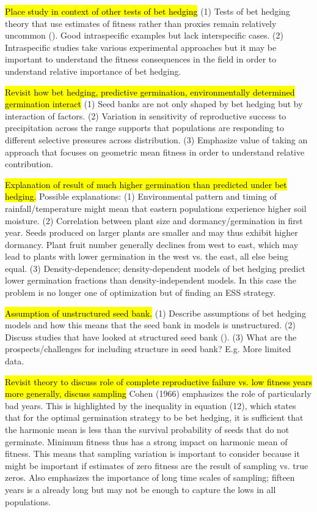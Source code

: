 \documentclass[12pt, oneside, titlepage]{article}   	%
\begin{document}
{\hl{Place study in context of other tests of bet hedging} (1) Tests of bet hedging theory that use estimates of fitness rather than proxies remain relatively uncommon (\cite{simons2011}). Good intraspecific examples but lack interspecific cases. (2) Intraspecific studies take various experimental approaches but it may be important to understand the fitness consequences in the field in order to understand relative importance of bet hedging. 

\hl{Revisit how bet hedging, predictive germination, environmentally determined germination interact} (1) Seed banks are not only shaped by bet hedging but by interaction of factors. (2) Variation in sensitivity of reproductive success to precipitation across the range supports that populations are responding to different selective pressures across distribution. (3) Emphasize value of taking an approach that focuses on geometric mean fitness in order to understand relative contribution.

\hl{Explanation of result of much higher germination than predicted under bet hedging.} Possible explanations: (1) Environmental pattern and timing of rainfall/temperature might mean that eastern populations experience higher soil moisture. (2) Correlation between plant size and dormancy/germination in first year. Seeds produced on larger plants are smaller and may thus exhibit higher dormancy. Plant fruit number generally declines from west to east, which may lead to plants with lower germination in the west vs. the east, all else being equal. (3) Density-dependence; density-dependent models of bet hedging predict lower germination fractions than density-independent models. In this case the problem is no longer one of optimization but of finding an ESS strategy.

\hl{Assumption of unstructured seed bank.} (1) Describe assumptions of bet hedging models and how this means that the seed bank in models is unstructured. (2) Discuss studies that have looked at structured seed bank (\cite{philippi1993a}). (3) What are the prospects/challenges for including structure in seed bank? E.g. More limited data.

\hl{Revisit theory to discuss role of complete reproductive failure vs. low fitness years more generally, discuss sampling} Cohen (1966) emphasizes the role of particularly bad years. This is highlighted by the inequality in equation (12), which states that for the optimal germination strategy to be bet hedging, it is sufficient that the harmonic mean is less than the survival probability of seeds that do not germinate. Minimum fitness thus has a strong impact on harmonic mean of fitness. This means that sampling variation is important to consider because it might be important if estimates of zero fitness are the result of sampling vs. true zeros. Also emphasizes the importance of long time scales of sampling; fifteen years is a already long but may not be enough to capture the lows in all populations. 


}
\end{document}
